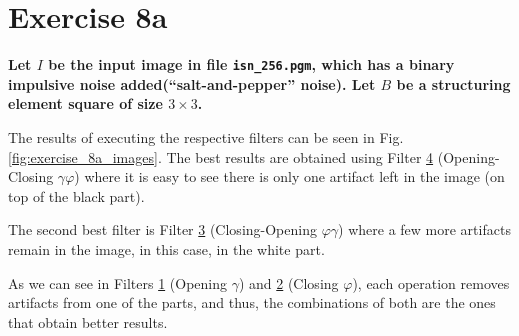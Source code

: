 \section*{Exercise 8a}

{
\bfseries 
Let $I$ be the input image in file \texttt{isn\_256.pgm}, which has a binary impulsive noise added(``salt-and-pepper'' noise). Let $B$ be a structuring element square of size $3 \times 3$.
}

The results of executing the respective filters can be seen in Fig. \ref{fig:exercise_8a_images}. The best results are obtained using Filter \hyperref[fig:exercise_8a_ope_clo]{4} (Opening-Closing $\gamma\varphi$) where it is easy to see there is only one artifact left in the image (on top of the black part).

The second best filter is Filter \hyperref[fig:exercise_8a_clo_ope]{3} (Closing-Opening $\varphi\gamma$) where a few more artifacts remain in the image, in this case, in the white part.

As we can see in Filters \hyperref[fig:exercise_8a_ope]{1} (Opening $\gamma$) and \hyperref[fig:exercise_8a_clo]{2} (Closing $\varphi$), each operation removes artifacts from one of the parts, and thus, the combinations of both are the ones that obtain better results.

